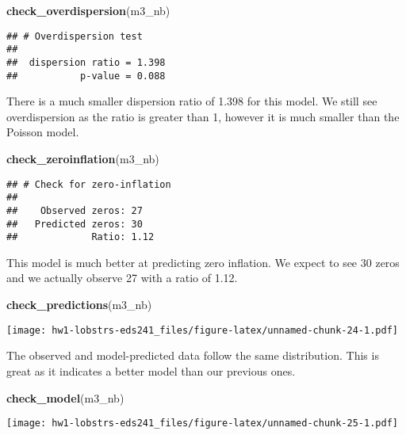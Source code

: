 \documentclass[
]{article}
\newenvironment{Shaded}{\begin{snugshade}}{\end{snugshade}}
\newcommand{\FunctionTok}[1]{\textcolor[rgb]{0.13,0.29,0.53}{\textbf{#1}}}
\newcommand{\NormalTok}[1]{#1}
\begin{document}
\begin{Shaded}
\begin{Highlighting}[]
\FunctionTok{check\_overdispersion}\NormalTok{(m3\_nb)}
\end{Highlighting}
\end{Shaded}

\begin{verbatim}
## # Overdispersion test
## 
##  dispersion ratio = 1.398
##           p-value = 0.088
\end{verbatim}

There is a much smaller dispersion ratio of 1.398 for this model. We
still see overdispersion as the ratio is greater than 1, however it is
much smaller than the Poisson model.

\begin{Shaded}
\begin{Highlighting}[]
\FunctionTok{check\_zeroinflation}\NormalTok{(m3\_nb)}
\end{Highlighting}
\end{Shaded}

\begin{verbatim}
## # Check for zero-inflation
## 
##    Observed zeros: 27
##   Predicted zeros: 30
##             Ratio: 1.12
\end{verbatim}

This model is much better at predicting zero inflation. We expect to see
30 zeros and we actually observe 27 with a ratio of 1.12.

\begin{Shaded}
\begin{Highlighting}[]
\FunctionTok{check\_predictions}\NormalTok{(m3\_nb)}
\end{Highlighting}
\end{Shaded}

\texttt{[image: hw1-lobstrs-eds241\_files/figure-latex/unnamed-chunk-24-1.pdf]}

The observed and model-predicted data follow the same distribution. This
is great as it indicates a better model than our previous ones.

\begin{Shaded}
\begin{Highlighting}[]
\FunctionTok{check\_model}\NormalTok{(m3\_nb)}
\end{Highlighting}
\end{Shaded}

\texttt{[image: hw1-lobstrs-eds241\_files/figure-latex/unnamed-chunk-25-1.pdf]}
\end{document}
